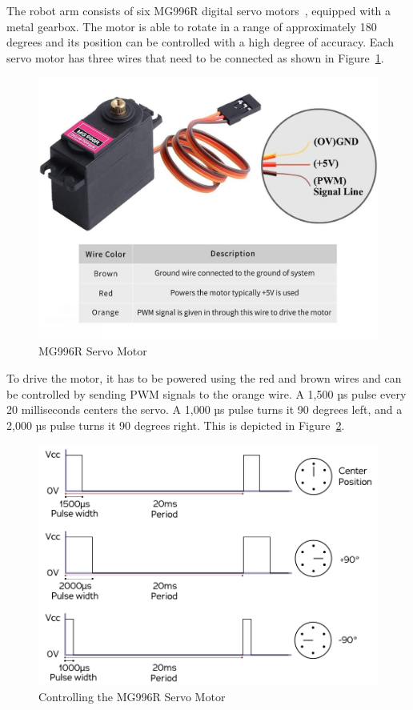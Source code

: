 \documentclass[MMR,Master,english]{style/twbook}
\begin{document}
\noindent The robot arm consists of six MG996R digital servo motors~\cite{MG996RServoMotor}, equipped with a metal gearbox. The motor is able to rotate in a range of approximately 180 degrees and its position can be controlled with a high degree of accuracy. Each servo motor has three wires that need to be connected as shown in Figure~\ref{fig:servo}.

\begin{figure}[H]
	\centering
	\includegraphics[width=0.7\columnwidth]{img/experiment/servo.jpg}
	\caption[MG996R Servo Motor]{MG996R Servo Motor~\cite{PackMg996rMetal}}
	\label{fig:servo}
\end{figure}

\noindent To drive the motor, it has to be powered using the red and brown wires and can be controlled by sending PWM signals to the orange wire. A 1,500 µs pulse every 20 milliseconds centers the servo. A 1,000 µs pulse turns it 90 degrees left, and a 2,000 µs pulse turns it 90 degrees right. This is depicted in Figure~\ref{fig:servo_angle}.

\begin{figure}[H]
	\centering
	\includegraphics[width=0.7\columnwidth]{img/experiment/servo_angle.png}
	\caption[Controlling the MG996R Servo Motor]{Controlling the MG996R Servo Motor~\cite{twierengEmilyQuadrupedDog}}
	\label{fig:servo_angle}
\end{figure}
\end{document}
